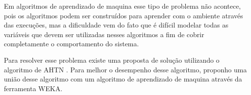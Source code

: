 Em algoritmos de aprendizado de maquina esse tipo de problema não acontece, pois os algoritmos podem ser construídos para aprender com o ambiente através das execuções,  mas a dificuldade vem do fato que é difícil modelar todas as variáveis que devem ser utilizadas nesses algoritmos a fim de cobrir completamente o comportamento do sistema. 


Para resolver esse problema existe uma proposta de solução utilizando o algoritmo de AHTN \cite{ontanon2015adversarial}. Para melhor o desempenho desse algoritmo, proponho uma união desse algoritmo com um algoritmo de aprendizado de maquina através da ferramenta WEKA. 

